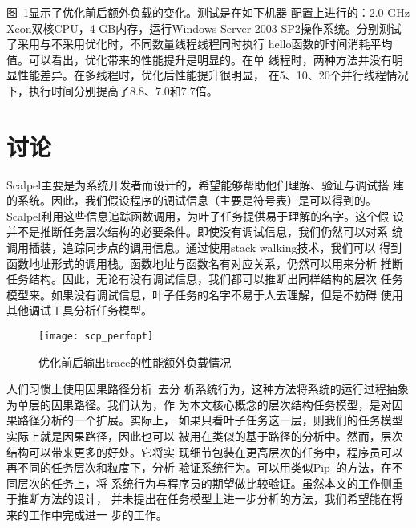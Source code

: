 图~\ref{fig:scpperf_opt}显示了优化前后额外负载的变化。测试是在如下机器
配置上进行的：2.0 GHz Xeon双核CPU，4 GB内存，运行Windows Server 2003
SP2操作系统。分别测试了采用与不采用优化时，不同数量线程线程同时执行
hello函数的时间消耗平均值。可以看出，优化带来的性能提升是明显的。在单
线程时，两种方法并没有明显性能差异。在多线程时，优化后性能提升很明显，
在5、10、20个并行线程情况下，执行时间分别提高了8.8、7.0和7.7倍。

\section{讨论}
\label{sec:scp:discussion}

Scalpel主要是为系统开发者而设计的，希望能够帮助他们理解、验证与调试搭
建的系统。因此，我们假设程序的调试信息（主要是符号表）是可以得到的。
Scalpel利用这些信息追踪函数调用，为叶子任务提供易于理解的名字。这个假
设并不是推断任务层次结构的必要条件。即使没有调试信息，我们仍然可以对系
统调用插装，追踪同步点的调用信息。通过使用stack walking技术，我们可以
得到函数地址形式的调用栈。函数地址与函数名有对应关系，仍然可以用来分析
推断任务结构。因此，无论有没有调试信息，我们都可以推断出同样结构的层次
任务模型来。如果没有调试信息，叶子任务的名字不易于人去理解，但是不妨碍
使用其他调试工具分析任务模型。

\begin{figure}[htbp]
  \centering
  \begin{minipage}{0.8\linewidth}
    \centering
    \texttt{[image: scp\_perfopt]}
    \caption{优化前后输出trace的性能额外负载情况}
    \label{fig:scpperf_opt}
  \end{minipage}
\end{figure}

人们习惯上使用因果路径分析~\cite{pinpoint, project5, pip, magpie}去分
析系统行为，这种方法将系统的运行过程抽象为单层的因果路径。我们认为，作
为本文核心概念的层次结构任务模型，是对因果路径分析的一个扩展。实际上，
如果只看叶子任务这一层，则我们的任务模型实际上就是因果路径，因此也可以
被用在类似的基于路径的分析中。然而，层次结构可以带来更多的好处。它将实
现细节包装在更高层次的任务中，程序员可以再不同的任务层次和粒度下，分析
验证系统行为。可以用类似Pip~\cite{pip}的方法，在不同层次的任务上，将
系统行为与程序员的期望做比较验证。虽然本文的工作侧重于推断方法的设计，
并未提出在任务模型上进一步分析的方法，我们希望能在将来的工作中完成进一
步的工作。


